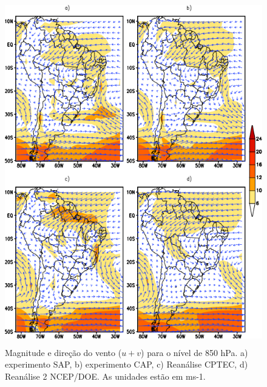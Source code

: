 \begin{figure}[!hbp]
\centering
\includegraphics[height=15cm]{./figs/media_ventos_anl_850hPa.png}
\caption{Magnitude e direção do vento ($u+v$) para o nível de 850 hPa. a) experimento SAP, b) experimento CAP, c) Reanálise CPTEC, d) Reanálise 2 NCEP/DOE. As unidades estão em ms-1.}
\label{fig17}
\end{figure}

